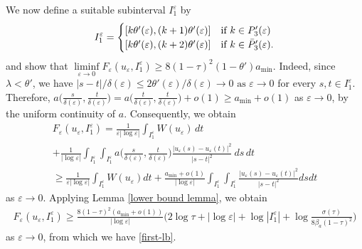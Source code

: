 \documentclass[12pt]{article}
\numberwithin{equation}{section}
\def\e{\varepsilon}
\begin{document}
We now define a suitable subinterval $I^\varepsilon_1$ by
    \[
    I^{\e}_{1}=\begin{cases}
    [k\theta'(\e) ,(k+1)\theta'(\e) ] & \hbox{if}\,\, k\in P'_{3}(\varepsilon)\\
    [k\theta'(\e) ,(k+2)\theta'(\e) ] & \hbox{if}\,\, k\in \bar{P}'_{3}(\varepsilon).
    \end{cases}
    \]
and show that
$\liminf\limits_{\varepsilon\to0}F_{\varepsilon}(u_{\varepsilon},I^{\e}_{1})\ge8(1-\tau)^{2}(1-\theta')a_{\min}$. Indeed, since $\lambda<\theta'$, we have $|s-t|/\delta(\e)\le2\theta'(\e)/\delta(\e)\to0\,\,\text{as}\,\,\e\to0$ for every $s,t\in I^{\e}_{1}$. Therefore, 
$
a\big(\frac{s}{\delta(\e) },\frac{t}{\delta(\e) }
    \big)=a\big(\frac{t}{\delta(\e) },\frac{t}{\delta(\e) }\big)+o(1)\ge a_{\min}+o(1)
$ 
as $\e\to 0$, by the uniform continuity of $a$. Consequently, we obtain
\begin{multline*}
F_{\varepsilon}(u_{\varepsilon},I^{\e}_{1})=\frac{1}{\varepsilon\left|\log\varepsilon\right|}\int_{I^{\e}_{1}} W(u_{\varepsilon})\,dt\\+\frac{1}{\left|\log\varepsilon\right|}
\int_{I^{\e}_{1}}\int_{I^{\e}_{1}}a\Big(\frac{s}{\delta(\e) },\frac{t}{\delta(\e) }
    \Big)
\frac{\left|u_{\varepsilon}(s)-u_{\varepsilon}(t)\right|^2}{\left|s-t\right|^2}\
ds\,dt
\\
\ge \frac{1}{\varepsilon\left|\log\varepsilon
\right|}\int_{I^{\e}_{1}} W(u_{\varepsilon})dt+\frac{a_{\min}+o(1)}{\left|\log\varepsilon\right|}
\int_{I^{\e}_{1}}\int_{I^{\e}_{1}}
\frac{\left|u_{\varepsilon}(s)-u_{\varepsilon}(t)\right|^2}{\left|s-t\right|^2}
dsdt  
\end{multline*}
    as $\varepsilon\to0$. Applying Lemma \ref{lower bound lemma}, we obtain
\begin{multline*}
F_{\varepsilon}(u_{\varepsilon},I^{\e}_{1}) \ge
\frac{8(1-\tau)^{2}(a_{\min}+o(1))}{|\log{\varepsilon}|}
\Big( 2\log{\tau} + |\log\varepsilon|
+ \log|I^{\e}_{1}| 
+ \log\frac{\sigma(\tau)}{8\beta_{a}(1-\tau)^{2}} \Big)
\end{multline*}
    as $\varepsilon\to0$, from which we have 
    \eqref{first-lb}. 
\end{document}
